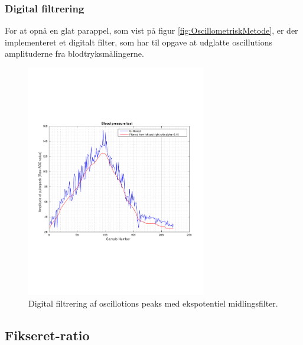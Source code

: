 \subsubsection{Digital filtrering}
For at opnå en glat parappel, som vist på  figur \ref{fig:OscillometriskMetode}, er der implementeret et digitalt filter, som har til opgave at udglatte oscillutions amplituderne fra blodtryksmålingerne. 

\begin{figure}[H]
	\centering
	\includegraphics[trim={0 0 0 0},clip, width=0.7\textwidth]{billeder/digitalFilterData.pdf}
	\caption{Digital filtrering af oscillotions peaks med ekspotentiel midlingsfilter. }\label{fig:digitalFilterData}
\end{figure}


\subsection{Fikseret-ratio} \label{Fikseret-ratio}